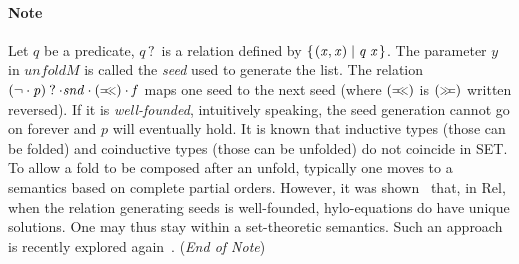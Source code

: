 \documentclass{llncs}
\newcommand{\Varid}[1]{\mathit{#1}}
\let\Varid\mathit
\begin{document}
\paragraph{Note} Let \ensuremath{\Varid{q}} be a predicate, \ensuremath{\Varid{q}\mathbin{?}} is a relation defined by \ensuremath{\{\mskip1.5mu (\Varid{x},\Varid{x})\mid\Varid{q}\;\Varid{x}\mskip1.5mu\}}. The parameter \ensuremath{\Varid{y}} in \ensuremath{\Varid{unfoldM}} is called the {\em seed} used to generate the list. The relation \ensuremath{(\neg \mathbin{\cdot}\Varid{p})\mathbin{?}\mathbin{\cdot}\Varid{snd}\mathbin{\cdot}(\mathbin{\hstretch{0.7}{=\!\!<\!\!<}})\mathbin{\cdot}\Varid{f}} maps one seed to the next seed (where \ensuremath{(\mathbin{\hstretch{0.7}{=\!\!<\!\!<}})} is \ensuremath{(\mathrel{\hstretch{0.7}{>\!\!>\!\!=}})} written reversed). If it is {\em well-founded}, intuitively speaking, the seed generation cannot go on forever and \ensuremath{\Varid{p}} will eventually hold. It is known that inductive types (those can be folded) and coinductive types (those can be unfolded) do not coincide in {\sf SET}. To allow a fold to be composed after an unfold, typically one moves to a semantics based on complete partial orders. However, it was shown~\cite{DoornbosBackhouse:95:Induction} that, in {\sf Rel}, when the relation generating seeds is well-founded, hylo-equations do have unique solutions. One may thus stay within a set-theoretic semantics. Such an approach is recently explored again~\cite{Hinze:15:Conjugate}. ({\em End of Note})
\end{document}
